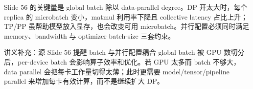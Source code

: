 Slide 56 的关键量是 global batch 除以 data-parallel degree。DP 开太大时，每个 replica 的 microbatch 变小，matmul 利用率下降且 collective latency 占比上升；TP/PP 虽帮助模型放入显存，也会改变可用 microbatch。并行配置必须同时满足 memory、bandwidth 与 optimizer batch-size 三套约束。

\begin{knowledgebox}{讲义补充：源 Slide 56 提醒 batch 与并行配置耦合}
global batch 被 GPU 数切分后，per-device batch 会影响算子效率和优化。若 GPU 太多而 batch 不够大，data parallel 会把每卡工作量切得太薄；此时更需要 model/tensor/pipeline parallel 来增加每卡有效计算，而不是继续扩大 DP。
\end{knowledgebox}


